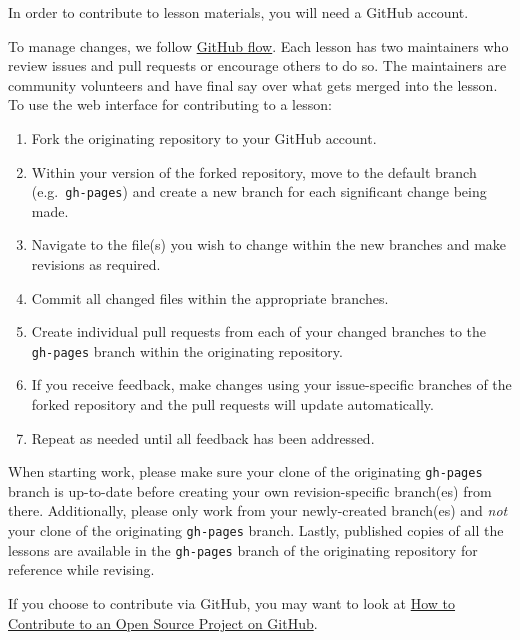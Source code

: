 \documentclass[
]{book}
\providecommand{\tightlist}{%
  \setlength{\itemsep}{0pt}\setlength{\parskip}{0pt}}
\begin{document}
In order to contribute to lesson materials, you will need a GitHub account.

To manage changes, we follow \href{https://guides.github.com/introduction/flow/}{GitHub flow}.
Each lesson has two maintainers who review issues and pull requests or encourage others to do so.
The maintainers are community volunteers and have final say over what gets merged into the lesson.
To use the web interface for contributing to a lesson:

\begin{enumerate}
\def\labelenumi{\arabic{enumi}.}
\tightlist
\item
  Fork the originating repository to your GitHub account.
\item
  Within your version of the forked repository, move to the
  default branch (e.g.~\texttt{gh-pages}) and
  create a new branch for each significant change being made.
\item
  Navigate to the file(s) you wish to change within the new branches and make revisions as required.
\item
  Commit all changed files within the appropriate branches.
\item
  Create individual pull requests from each of your changed branches
  to the \texttt{gh-pages} branch within the originating repository.
\item
  If you receive feedback, make changes using your issue-specific branches of the forked
  repository and the pull requests will update automatically.
\item
  Repeat as needed until all feedback has been addressed.
\end{enumerate}

When starting work, please make sure your clone of the originating \texttt{gh-pages} branch is up-to-date
before creating your own revision-specific branch(es) from there.
Additionally, please only work from your newly-created branch(es) and \emph{not}
your clone of the originating \texttt{gh-pages} branch.
Lastly, published copies of all the lessons are available in the \texttt{gh-pages} branch of the originating
repository for reference while revising.

If you choose to contribute via GitHub, you may want to look at
\href{https://egghead.io/series/how-to-contribute-to-an-open-source-project-on-github}{How to Contribute to an Open Source Project on GitHub}.

  
\end{document}
